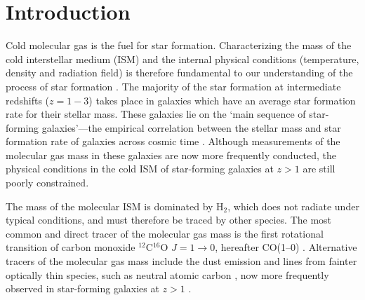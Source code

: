 \documentclass[twocolumn]{aastex62}
\newcommand{\HH}{\ensuremath{\mathrm{H}_{2}}}
\newcommand{\CI}{\ensuremath{\mathrm{[C\, \textsc{i}]}}}
\begin{document}
\section{Introduction}
\label{sec:intro}
Cold molecular gas is the fuel for star formation.  Characterizing the mass of
the cold interstellar medium (ISM) and the internal physical conditions
(temperature, density and radiation field) is therefore fundamental to our
understanding of the process of star formation \citep[see the reviews
by][]{McKee2007, Kennicutt2012, Carilli2013}.  The majority of the star
formation at intermediate redshifts ($z=1-3$) takes place in galaxies which
have an average star formation rate for their stellar mass.  These galaxies lie
on the `main sequence of star-forming galaxies'---the empirical correlation
between the stellar mass and star formation rate of galaxies across cosmic time
\citep[e.g.,][]{Noeske2007a, Elbaz2011, Whitaker2014, Schreiber2015,
  Boogaard2018}.  Although measurements of the molecular gas mass in these
galaxies are now more frequently conducted, the physical conditions in the cold
ISM of star-forming galaxies at $z>1$ are still poorly constrained.

The mass of the molecular ISM is dominated by \HH, which does not radiate under
typical conditions, and must therefore be traced by other species.  The most
common and direct tracer of the molecular gas mass is the first rotational
transition of carbon monoxide $^{12}$C$^{16}$O $J=1\rightarrow 0$, hereafter
CO(1--0) \citep[e.g.,][]{Dickman1986, Solomon1987, Bolatto2008}.  Alternative
tracers of the molecular gas mass include the dust emission
\cite[e.g.,][]{Hildebrand1983, Magdis2012, Scoville2014, Scoville2016,
  Magnelli2020} and lines from fainter optically thin species, such as neutral
atomic carbon \citep[\CI;][]{Papadopoulos2004, Weiss2005a, Walter2011}, now
more frequently observed in star-forming galaxies at $z>1$
\citep[e.g.,][]{Popping2017, Valentino2018, Bourne2019}.
\end{document}
